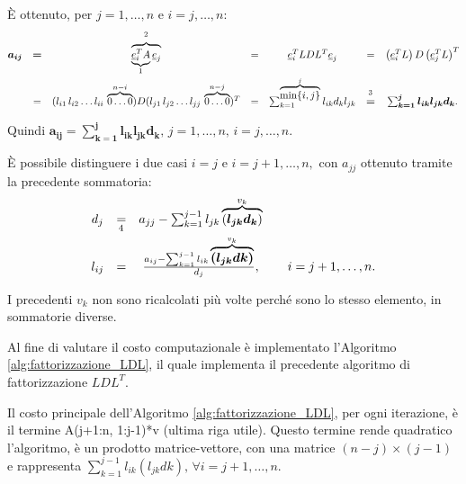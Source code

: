 È ottenuto, per $j=1,\hdots, n$ e $i=j,\hdots, n:$
\begin{equation*}
    \begin{matrix}
        \boldsymbol{a_{ij}}&\boldsymbol =&\overbrace{\underbrace{\uline e_i^TA}_{\footnotemark}\uline e_j}^{\footnotemark} &=&\uline e_i^T LDL^T \uline e_j &=& \left(\uline e_i^T L\right)D\left(\uline e_j^TL\right)^T\\
        &=& (l_{i1}\, l_{i2}\hdots l_{ii}\, \overbrace{0\hdots 0}^{n-i})D (l_{j1}\, l_{j2}\hdots l_{jj}\, \overbrace{0\hdots 0}^{n-j})^T &=& \sum_{k=1}^{\overbrace{\min\{i,j\}}^{j}}l_{ik}d_kl_{jk}&\overset{\footnotemark}{\boldsymbol =}&\boldsymbol{\sum_{k=1}^jl_{ik}l_{jk}d_k}.
    \end{matrix}
\end{equation*}

\addtocounter{footnote}{-2}



Quindi $\boldsymbol{a_{ij}=\sum_{k=1}^jl_{ik}l_{jk}d_k},\,j=1,\hdots, n,\,i=j,\hdots, n.$

È possibile distinguere i due casi $i=j$ e $i=j+1,\hdots, n,$ con $a_{jj}$ ottenuto tramite la precedente sommatoria:
\begin{equation}\label{eq:d_j,l_ij}
    \begin{matrix}
        d_j&\underset{\footnotemark}{=}& a_{jj}-\sum_{k=1}^{j-1}l_{jk}\overbrace{(\boldsymbol{l_{jk}d_k})}^{v_k}\\
        l_{ij}&=& \frac{a_{ij}-\sum_{k=1}^{j-1}l_{ik}\overbrace{\boldsymbol{(l_{jk}dk)}}^{v_k}}{d_j}, && i=j+1,\hdots,n.
    \end{matrix}
\end{equation}


I precedenti $v_k$ non sono ricalcolati più volte perché sono lo stesso elemento, in sommatorie diverse.

Al fine di valutare il costo computazionale è implementato l'Algoritmo \ref{alg:fattorizzazione_LDL}, il quale implementa il precedente algoritmo di fattorizzazione $LDL^T$.

Il costo principale dell'Algoritmo \ref{alg:fattorizzazione_LDL}, per ogni iterazione, è il termine A(j+1:n, 1:j-1)*v (ultima riga utile). Questo termine rende quadratico l'algoritmo, è un prodotto matrice-vettore, con una matrice $(n-j)\times (j-1)$ e rappresenta $\sum_{k=1}^{j-1}l_{ik}\left(l_{jk}dk\right),\, \forall i=j+1,\hdots,n.$

